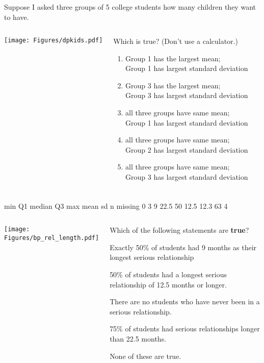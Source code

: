 \begin{frame}
\frametitle{}
Suppose I asked three groups of 5 college students how many children they want to have.\\
\begin{columns}
\texttt{[image: Figures/dpkids.pdf]}\\
\begin{clicker}{Which is true? (Don't use a calculator.)}
\begin{enumerate}
    \item
    Group 1 has the largest mean;\\ Group 1 has largest standard deviation
    \item
    Group 3 has the largest mean;\\ Group 3 has largest standard deviation
    \item
    all three groups have same mean;\\ Group 1 has largest standard deviation
    \item
    all three groups have same mean;\\ Group 2 has largest standard deviation
    \item
    all three groups have same mean;\\ Group 3 has largest standard deviation
    \end{enumerate}
\end{clicker}
\end{columns}
\end{frame}




\begin{frame}[fragile]
\frametitle{\grp}
\begin{lcverbatim}
 min Q1 median   Q3 max mean   sd  n missing
   0  3      9 22.5  50 12.5 12.3 63       4
\end{lcverbatim}
\begin{columns}
\texttt{[image: Figures/bp\_rel\_length.pdf]}
\begin{clicker}{Which of the following statements are \textbf{true}?}
\begin{enumerate}
    \small{
    \item
    Exactly 50\% of students had 9 months as their longest serious relationship
    \item
    50\% of students had a longest serious relationship of 12.5 months or longer.
    \item
    There are no students who have never been in a serious relationship.
    \item
    75\% of students had serious relationships longer than 22.5 months.
    \item 
    None of these are true.}
\end{enumerate}
\end{clicker}
\end{columns}
\end{frame}


